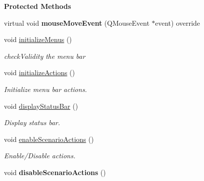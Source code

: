 \begin{Indent}\textbf{ Protected Methods}\par
\begin{DoxyCompactItemize}
\item 
\mbox{\label{classrev_1_1_main_window_ab62d5e29dfd0fa0823a4044001e05909}} 
virtual void {\bfseries mouse\+Move\+Event} (Q\+Mouse\+Event $\ast$event) override
\item 
void \mbox{\hyperlink{classrev_1_1_main_window_a164619747b7c7a10d63a628154a6eeb5}{initialize\+Menus}} ()
\begin{DoxyCompactList}\small\item\em check\+Validity the menu bar \end{DoxyCompactList}\item 
\mbox{\label{classrev_1_1_main_window_a811ad06cfc153c740a788f4f3613b6d8}} 
void \mbox{\hyperlink{classrev_1_1_main_window_a811ad06cfc153c740a788f4f3613b6d8}{initialize\+Actions}} ()
\begin{DoxyCompactList}\small\item\em Initialize menu bar actions. \end{DoxyCompactList}\item 
\mbox{\label{classrev_1_1_main_window_a025b814b5db0000fe2aaf88c7082b810}} 
void \mbox{\hyperlink{classrev_1_1_main_window_a025b814b5db0000fe2aaf88c7082b810}{display\+Status\+Bar}} ()
\begin{DoxyCompactList}\small\item\em Display status bar. \end{DoxyCompactList}\item 
\mbox{\label{classrev_1_1_main_window_a9b2d427fed6e6a07fbcf6aab6ae2bda8}} 
void \mbox{\hyperlink{classrev_1_1_main_window_a9b2d427fed6e6a07fbcf6aab6ae2bda8}{enable\+Scenario\+Actions}} ()
\begin{DoxyCompactList}\small\item\em Enable/\+Disable actions. \end{DoxyCompactList}\item 
\mbox{\label{classrev_1_1_main_window_a1a05c19f51e2ebdb6da268169eee612b}} 
void {\bfseries disable\+Scenario\+Actions} ()
\end{DoxyCompactItemize}
\end{Indent}
